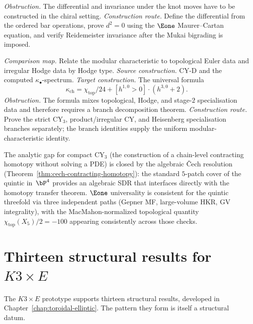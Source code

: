 \begin{description}[leftmargin=2.7em,style=nextline,topsep=0.3ex,itemsep=0.6ex]
 \emph{Obstruction.}
 The differential and invariance under the knot moves have
 to be constructed in the chiral setting.
 \emph{Construction route.}
 Define the differential from the ordered bar operations,
 prove $d^2=0$ using the $\Eone$ Maurer--Cartan equation,
 and verify Reidemeister invariance after the Mukai
 bigrading is imposed.
 \item[\textbf{CM--KF. Stratified modular-characteristic formula.}]
 \emph{Comparison map.}
 Relate the modular characteristic to topological Euler data
 and irregular Hodge data by Hodge type.
 \emph{Source construction.}
 CY-D and the computed $\kappa_\bullet$-spectrum.
 \emph{Target construction.}
 The universal formula
 \[
 \kappa_{\mathrm{ch}}
 =
 \chi_{\mathrm{top}}/24
 +
 [h^{1,0}>0]\cdot(h^{3,0}+2).
 \]
 \emph{Obstruction.}
 The formula mixes topological, Hodge, and stage-$2$
 specialisation data and therefore requires a branch
 decomposition theorem.
 \emph{Construction route.}
 Prove the strict CY$_3$, product/irregular CY, and
 Heisenberg specialisation branches separately; the branch
 identities supply the uniform modular-characteristic identity.
\end{description}

The analytic gap for compact CY$_3$ (the construction of a
chain-level contracting homotopy without solving a PDE) is
closed by the algebraic \v{C}ech resolution
(Theorem~\ref{thm:cech-contracting-homotopy}): the standard
$5$-patch cover of the quintic in~$\bP^4$ provides an
algebraic SDR that interfaces directly with the homotopy
transfer theorem. $\Eone$ universality is consistent for the
quintic threefold via three independent paths (Gepner MF,
large-volume HKR, GV integrality), with the
MacMahon-normalized topological quantity
$\chi_{\mathrm{top}}(X_5)/2 = -100$ appearing consistently
across those checks.

\section{Thirteen structural results for \texorpdfstring{$K3 \times E$}{K3 x E}}
\label{sec:k3e-thirteen-results}

The $K3 \times E$ prototype supports thirteen structural
results, developed in Chapter~\ref{chap:toroidal-elliptic}.
The pattern they form is itself a structural datum.


